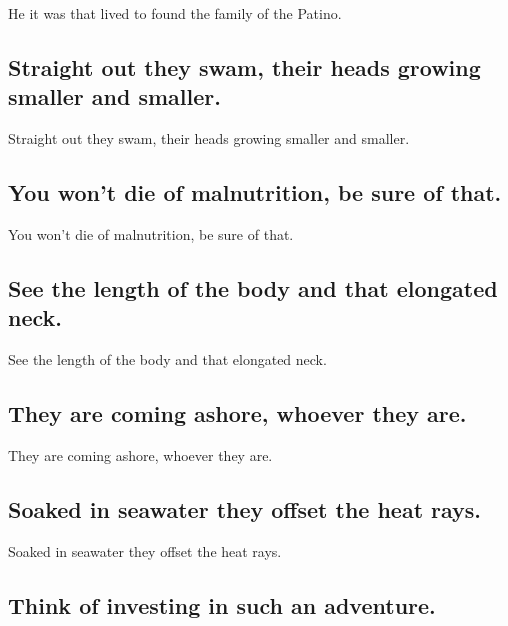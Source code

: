 \documentclass[]{article}
\begin{document}
He it was that lived to found the family of the Patino.

\hypertarget{straight-out-they-swam-their-heads-growing-smaller-and-smaller.}{%
\subsection{Straight out they swam, their heads growing smaller and
smaller.}\label{straight-out-they-swam-their-heads-growing-smaller-and-smaller.}}

Straight out they swam, their heads growing smaller and smaller.

\hypertarget{you-wont-die-of-malnutrition-be-sure-of-that.}{%
\subsection{You won't die of malnutrition, be sure of
that.}\label{you-wont-die-of-malnutrition-be-sure-of-that.}}

You won't die of malnutrition, be sure of that.

\hypertarget{see-the-length-of-the-body-and-that-elongated-neck.}{%
\subsection{See the length of the body and that elongated
neck.}\label{see-the-length-of-the-body-and-that-elongated-neck.}}

See the length of the body and that elongated neck.

\hypertarget{they-are-coming-ashore-whoever-they-are.}{%
\subsection{They are coming ashore, whoever they
are.}\label{they-are-coming-ashore-whoever-they-are.}}

They are coming ashore, whoever they are.

\hypertarget{soaked-in-seawater-they-offset-the-heat-rays.}{%
\subsection{Soaked in seawater they offset the heat
rays.}\label{soaked-in-seawater-they-offset-the-heat-rays.}}

Soaked in seawater they offset the heat rays.

\hypertarget{think-of-investing-in-such-an-adventure.}{%
\subsection{Think of investing in such an
adventure.}\label{think-of-investing-in-such-an-adventure.}}
\end{document}
